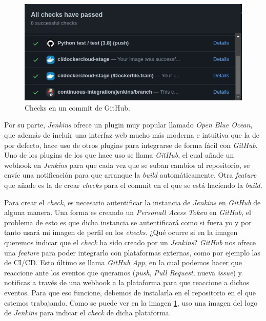\begin{figure}[H]
	\includegraphics[width=.7\linewidth]{imagenes/05_Implementacion/ghchecks.png}
	\centering
	\caption{Checks en un commit de GitHub.}
	\label{fig:ghchecks}
\end{figure}

Por su parte, \textit{Jenkins} ofrece un plugin muy popular llamado \textit{Open Blue Ocean}, que además de incluir una interfaz web mucho más moderna e intuitiva que la de por defecto, hace uso de otros plugins para integrarse de forma fácil con \textit{GitHub}. Uno de los plugins de los que hace uso se llama \textit{GitHub}, el cual añade un webhook en \textit{Jenkins} para que cada vez que se suban cambios al repositorio, se envíe una notificación para que arranque la \textit{build} automáticamente. Otra \textit{feature} que añade es la de crear \textit{checks} para el commit en el que se está haciendo la \textit{build}.\newline

Para crear el \textit{check}, es necesario autentificar la instancia de \textit{Jenkins} en \textit{GitHub} de alguna manera. Una forma es creando un \textit{Personall Acess Token} en \textit{GitHub}, el problema de esto es que dicha instancia se autentificará como si fuera yo y por tanto usará mi imagen de perfil en los \textit{checks}. ¿Qué ocurre si en la imagen queremos indicar que el \textit{check} ha sido creado por un \textit{Jenkins}? \textit{GitHub} nos ofrece una \textit{feature} para poder integrarlo con plataformas externas, como por ejemplo las de CI/CD. Esto último se llama \textit{GitHub App}, en la cual podemos hacer que reaccione ante los eventos que queramos (\textit{push}, \textit{Pull Request}, nueva \textit{issue}) y notificas a través de una webhook a la plataforma para que reaccione a dichos eventos. Para que eso funcione, debemos de instalarla en el repositorio en el que estemos trabajando. Como se puede ver en la imagen \ref{fig:ghchecks}, uso una imagen del logo de \textit{Jenkins} para indicar el \textit{check} de dicha plataforma.\\

